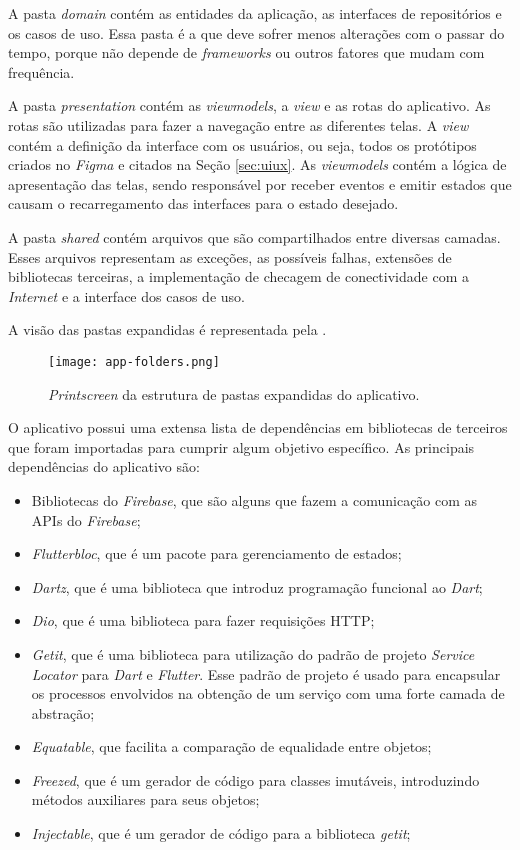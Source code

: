 A pasta \textit{domain} contém as entidades da aplicação, as interfaces de repositórios e os casos de uso. Essa pasta é a que deve sofrer menos alterações com o passar do tempo, porque não depende de \textit{frameworks} ou outros fatores que mudam com frequência.

A pasta \textit{presentation} contém as \textit{viewmodels}, a \textit{view} e as rotas do aplicativo. As rotas são utilizadas para fazer a navegação entre as diferentes telas. A \textit{view} contém a definição da interface com os usuários, ou seja, todos os protótipos criados no \textit{Figma} e citados na Seção \ref{sec:uiux}. As \textit{viewmodels} contém a lógica de apresentação das telas, sendo responsável por receber eventos e emitir estados que causam o recarregamento das interfaces para o estado desejado.

A pasta \textit{shared} contém arquivos que são compartilhados entre diversas camadas. Esses arquivos representam as exceções, as possíveis falhas, extensões de bibliotecas terceiras, a implementação de checagem de conectividade com a \textit{Internet} e a interface dos casos de uso.

A visão das pastas expandidas é representada pela .

\begin{figure}[!htb]
  \centering
  \texttt{[image: app-folders.png]}
  \caption{\textit{Printscreen} da estrutura de pastas expandidas do aplicativo.}
  \label{fig:folders}
\end{figure}

O aplicativo possui uma extensa lista de dependências em bibliotecas de terceiros que foram importadas para cumprir algum objetivo específico. As principais dependências do aplicativo são:

\begin{itemize}
  \item Bibliotecas do \textit{Firebase}, que são alguns  que fazem a comunicação com as APIs do \textit{Firebase};
  \item \textit{Flutter\underline{\space}bloc}, que é um pacote para gerenciamento de estados;
  \item \textit{Dartz}, que é uma biblioteca que introduz programação funcional ao \textit{Dart};
  \item \textit{Dio}, que é uma biblioteca para fazer requisições HTTP;
  \item \textit{Get\underline{\space}it}, que é uma biblioteca para utilização do padrão de projeto \textit{Service Locator} para \textit{Dart} e \textit{Flutter}. Esse padrão de projeto é usado para encapsular os processos envolvidos na obtenção de um serviço com uma forte camada de abstração;
  \item \textit{Equatable}, que facilita a comparação de equalidade entre objetos;
  \item \textit{Freezed}, que é um gerador de código para classes imutáveis, introduzindo métodos auxiliares para seus objetos;
  \item \textit{Injectable}, que é um gerador de código para a biblioteca \textit{get\underline{\space}it};
\end{itemize}

